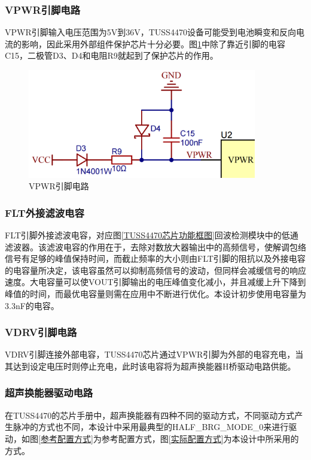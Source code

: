     \subsubsection{VPWR引脚电路}
    VPWR引脚输入电压范围为5V到36V，TUSS4470设备可能受到电池瞬变和反向电流的影响，因此采用外部组件保护芯片十分必要。图\ref{VPWR引脚}中除了靠近引脚的电容C15，二极管D3、D4和电阻R9就起到了保护芯片的作用。
     \begin{figure}[ht]
    	\centering
    	\includegraphics[width=10cm]{figure/VPWR PIN.png}
    	\caption{VPWR引脚电路}
    	\label{VPWR引脚}
    \end{figure}
        \subsubsection{FLT外接滤波电容}
    FLT引脚外接滤波电容，对应图\ref{TUSS4470芯片功能框图}回波检测模块中的低通滤波器。该滤波电容的作用在于，去除对数放大器输出中的高频信号，使解调包络信号有足够的峰值保持时间，而截止频率的大小则由FLT引脚的阻抗以及外接电容的电容量所决定，该电容虽然可以抑制高频信号的波动，但同样会减缓信号的响应速度。大电容量可以使VOUT引脚输出的电压峰值变化减小，并且减缓上升下降到峰值的时间，而最优电容量则需在应用中不断进行优化。本设计初步使用电容量为3.3nF的电容。
    \subsubsection{VDRV引脚电路}    
    VDRV引脚连接外部电容，TUSS4470芯片通过VPWR引脚为外部的电容充电，当其达到设定电压时则停止充电，此时该电容将为超声换能器H桥驱动电路供能。
     \subsubsection{超声换能器驱动电路}
    在TUSS4470的芯片手册中，超声换能器有四种不同的驱动方式，不同驱动方式产生脉冲的方式也不同，本设计中采用最典型的HALF\_BRG\_MODE\_0来进行驱动，如图\ref{参考配置方式}为参考配置方式，图\ref{实际配置方式}为本设计中所采用的方式。
    
